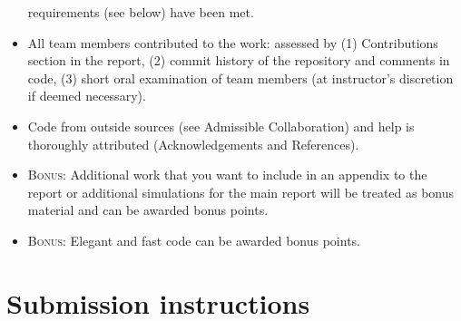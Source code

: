 \documentclass[letterpaper]{scrartcl}
\newcommand{\BONUS}{\textsc{Bonus: }}
\begin{document}
\begin{framed}
\begin{itemize}
    requirements (see below) have been met.
  \item All team members contributed to the work: assessed by (1)
    Contributions section in the report, (2) commit history of the
    repository and comments in code, (3) short oral examination of
    team members (at instructor's discretion if deemed necessary).
  \item Code from outside sources (see Admissible Collaboration) and
    help is thoroughly attributed (Acknowledgements and References).
  \item \BONUS Additional work that you want to include in an appendix to
    the report or additional simulations for the main report will be
    treated as bonus material and can be awarded bonus points.
  \item \BONUS Elegant and fast code can be awarded bonus points.
  \end{itemize}
\end{framed}

\newpage
\tableofcontents{}

\section{Submission instructions}
\end{document}
